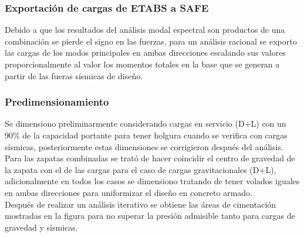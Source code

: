 \documentclass{article}%
\begin{document}
\subsubsection{Exportación de cargas de ETABS a SAFE}
Debido a que los resultados del análisis modal espectral son productos de una combinación se pierde el signo en las fuerzas, para un análisis racional se exporto las cargas de los modos principales en ambas direcciones escalando sus valores proporcionalmente al valor los momentos totales en la base que se generan a partir de las fueras sísmicas de diseño.

\subsubsection{Predimensionamiento}

Se dimensiono preliminarmente considerando cargas en servicio (D+L) con un 90\% de la capacidad portante para tener holgura cuando se verifica con cargas sísmicas, posteriormente estas dimensiones se corrigieron después del análisis.\\
Para las zapatas combinadas se trató de hacer coincidir el centro de gravedad de la zapata con el de las cargas para el caso de cargas gravitacionales (D+L), adicionalmente en todos los casos se dimensiono tratando de tener volados iguales en ambas direcciones para uniformizar el diseño en concreto armado.\\
Después de realizar un análisis iterativo se obtiene las áreas de cimentación mostradas en la figura  para no superar la presión admisible tanto para cargas de gravedad y sísmicas. 
\end{document}
